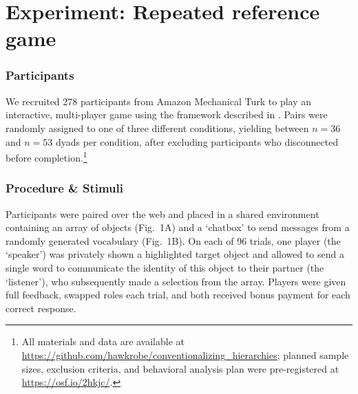 
			
\section{Experiment: Repeated reference game}

\subsubsection{Participants}

We recruited 278 participants from Amazon Mechanical Turk to play an interactive, multi-player game using the framework described in . Pairs were randomly assigned to one of three different conditions, yielding between $n=36$ and $n=53$ dyads per condition, after excluding participants who disconnected before completion.\footnote{All materials and data are available at \url{https://github.com/hawkrobe/conventionalizing_hierarchies}; planned sample sizes, exclusion criteria, and behavioral analysis plan were pre-registered at \url{https://osf.io/2hkjc/}.}

\subsubsection{Procedure \& Stimuli}
Participants were paired over the web and placed in a shared environment containing an array of objects (Fig.\ 1A) and a `chatbox' to send messages from a randomly generated vocabulary (Fig.\ 1B). On each of 96 trials, one player (the `speaker') was privately shown a highlighted target object and allowed to send a single word to communicate the identity of this object to their partner (the `listener'), who subsequently made a selection from the array. Players were given full feedback, swapped roles each trial, and both received bonus payment for each correct response.

